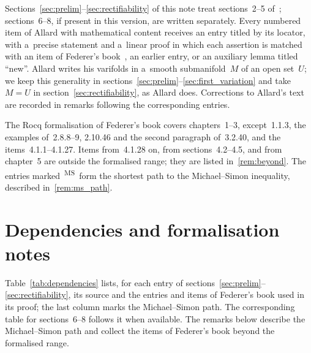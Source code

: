 \documentclass[a4paper,twoside,leqno]{article}
\newcommand{\MS}{\textsuperscript{MS}}              %
\begin{document}
Sections~\ref{sec:prelim}--\ref{sec:rectifiability} of this note treat sections~2--5
of~\cite{Allard1972}; sections~6--8, if present in this version, are written separately. Every
numbered item of Allard with mathematical content receives an entry titled by its locator, with
a~precise statement and a~linear proof in which each assertion is matched with an item of
Federer's book~\cite{Federer1969}, an earlier entry, or an auxiliary lemma titled ``new''. Allard
writes his varifolds in a~smooth submanifold~$M$ of an open set~$U$; we keep this generality in
sections~\ref{sec:prelim}--\ref{sec:first_variation} and take $M = U$ in
section~\ref{sec:rectifiability}, as Allard does. Corrections to Allard's text are recorded in
remarks following the corresponding entries.

The Rocq formalisation of Federer's book covers chapters~1--3, except~1.1.3, the examples
of~2.8.8--9, 2.10.46 and the second paragraph of~3.2.40, and the items~4.1.1--4.1.27. Items
from~4.1.28 on, from sections~4.2--4.5, and from chapter~5 are outside the formalised range; they
are listed in~\ref{rem:beyond}. The entries marked~\MS\ form the shortest path to the
Michael--Simon inequality, described in~\ref{rem:ms_path}.




\section{Dependencies and formalisation notes}
\label{sec:dependencies}

\begin{miniremark}
    \label{mr:dependencies}
    Table~\ref{tab:dependencies} lists, for each entry of
    sections~\ref{sec:prelim}--\ref{sec:rectifiability}, its source and the entries and items of
    Federer's book used in its proof; the last column marks the Michael--Simon path. The
    corresponding table for sections~6--8 follows it when available. The remarks below describe
    the Michael--Simon path and collect the items of Federer's book beyond the formalised range.
\end{miniremark}
\end{document}
